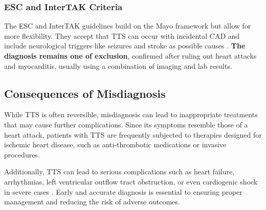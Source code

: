 \documentclass[12pt, BSc]{muthesis}
\begin{document}
\subsubsection{ESC and InterTAK Criteria}
The ESC and InterTAK guidelines build on the Mayo framework but allow for more flexibility. They accept that TTS can occur with incidental CAD and include neurological triggers like seizures and stroke as possible causes \cite{Ghadri2018}. \textbf{The diagnosis remains one of exclusion}, confirmed after ruling out heart attacks and myocarditis, usually using a combination of imaging and lab results.

\subsection{Consequences of Misdiagnosis}

While TTS is often reversible, misdiagnosis can lead to inappropriate treatments that may cause further complications. Since its symptoms resemble those of a heart attack, patients with TTS are frequently subjected to therapies designed for ischemic heart disease, such as anti-thrombotic medications or invasive procedures\cite{GUPTA2018165, Akashi2015}. 

Additionally, TTS can lead to serious complications such as heart failure, arrhythmias, left ventricular outflow tract obstruction, or even cardiogenic shock in severe cases \cite{GUPTA2018165}. Early and accurate diagnosis is essential to ensuring proper management and reducing the risk of adverse outcomes.


\end{document}
